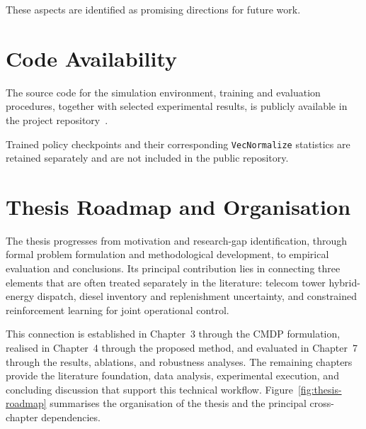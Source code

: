 These aspects are identified as promising directions for future work.


\section{Code Availability}
\label{sec:code_availability}


The source code for the simulation environment, training and
evaluation procedures, together with selected experimental
results, is publicly available in the project
repository~\cite{rlinv_code_repo}.

Trained policy checkpoints and their corresponding
\texttt{VecNormalize} statistics are retained separately
and are not included in the public repository.


\section{Thesis Roadmap and Organisation}

The thesis progresses from motivation and research-gap identification,
through formal problem formulation and methodological development, to
empirical evaluation and conclusions. Its principal contribution lies
in connecting three elements that are often treated separately in the
literature: telecom tower hybrid-energy dispatch, diesel inventory and
replenishment uncertainty, and constrained reinforcement learning for
joint operational control.

This connection is established in Chapter~3 through the CMDP
formulation, realised in Chapter~4 through the proposed method, and
evaluated in Chapter~7 through the results, ablations, and robustness
analyses. The remaining chapters provide the literature foundation,
data analysis, experimental execution, and concluding discussion that
support this technical workflow. Figure~\ref{fig:thesis-roadmap}
summarises the organisation of the thesis and the principal
cross-chapter dependencies.

